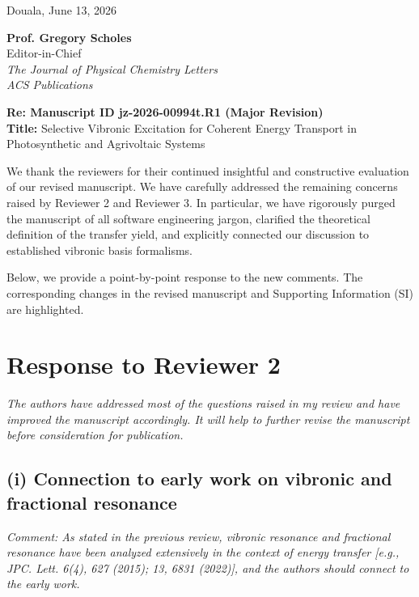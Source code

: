 \documentclass[11pt]{article}
\begin{document}
\begin{flushright}
    Douala, June 13, 2026
\end{flushright}

\noindent \textbf{Prof. Gregory Scholes}\\
Editor-in-Chief\\
\textit{The Journal of Physical Chemistry Letters}\\
\textit{ACS Publications}

\vspace{1em}

\noindent \textbf{Re: Manuscript ID jz-2026-00994t.R1 (Major Revision)}\\
\textbf{Title:} Selective Vibronic Excitation for Coherent Energy Transport in Photosynthetic and Agrivoltaic Systems

\vspace{2em}

\noindent We thank the reviewers for their continued insightful and constructive evaluation of our revised manuscript. We have carefully addressed the remaining concerns raised by Reviewer 2 and Reviewer 3. In particular, we have rigorously purged the manuscript of all software engineering jargon, clarified the theoretical definition of the transfer yield, and explicitly connected our discussion to established vibronic basis formalisms.

Below, we provide a point-by-point response to the new comments. The corresponding changes in the revised manuscript and Supporting Information (SI) are highlighted.

\vspace{2em}

\section*{Response to Reviewer 2}

\textit{The authors have addressed most of the questions raised in my review and have improved the manuscript accordingly. It will help to further revise the manuscript before consideration for publication.}

\subsection*{(i) Connection to early work on vibronic and fractional resonance}
\textit{Comment: As stated in the previous review, vibronic resonance and fractional resonance have been analyzed extensively in the context of energy transfer [e.g., JPC. Lett. 6(4), 627 (2015); 13, 6831 (2022)], and the authors should connect to the early work.}
\end{document}
